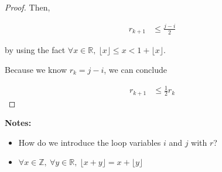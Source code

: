 \documentclass[12pt]{article}
\begin{document}
\begin{enumerate}[a.]
\begin{proof}
        Then,

        \begin{align}
            r_{k+1} &\leq \frac{j - i}{2}
        \end{align}

        by using the fact $\forall x \in \mathbb{R},\: \lfloor x \rfloor \leq x < 1 + \lfloor x \rfloor$.

        \bigskip

        Because we know $r_k = j - i$, we can conclude

        \begin{align}
            r_{k+1} &\leq \frac{1}{2} r_k
        \end{align}
    \end{proof}

    \textbf{Notes:}

    \begin{itemize}
        \item How do we introduce the loop variables $i$ and $j$ with $r$?
        \item $\forall x \in \mathbb{Z},\:\forall y \in \mathbb{R},\:\lfloor x+y \rfloor = x + \lfloor y \rfloor$
    \end{itemize}

\end{enumerate}
\end{document}
